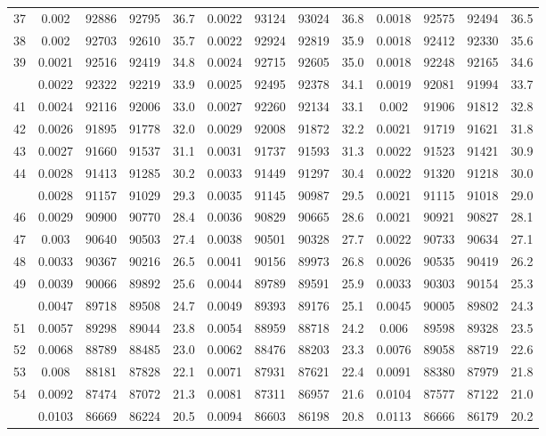 \documentclass[
  14pt,
]{article}
\begin{document}
\begin{longtable}[t]{lcccccccccccc}
37 & 0.002 & 92886 & 92795 & 36.7 & 0.0022 & 93124 & 93024 & 36.8 & 0.0018 & 92575 & 92494 & 36.5\\
38 & 0.002 & 92703 & 92610 & 35.7 & 0.0022 & 92924 & 92819 & 35.9 & 0.0018 & 92412 & 92330 & 35.6\\
39 & 0.0021 & 92516 & 92419 & 34.8 & 0.0024 & 92715 & 92605 & 35.0 & 0.0018 & 92248 & 92165 & 34.6\\
\addlinespace
40 & 0.0022 & 92322 & 92219 & 33.9 & 0.0025 & 92495 & 92378 & 34.1 & 0.0019 & 92081 & 91994 & 33.7\\
41 & 0.0024 & 92116 & 92006 & 33.0 & 0.0027 & 92260 & 92134 & 33.1 & 0.002 & 91906 & 91812 & 32.8\\
42 & 0.0026 & 91895 & 91778 & 32.0 & 0.0029 & 92008 & 91872 & 32.2 & 0.0021 & 91719 & 91621 & 31.8\\
43 & 0.0027 & 91660 & 91537 & 31.1 & 0.0031 & 91737 & 91593 & 31.3 & 0.0022 & 91523 & 91421 & 30.9\\
44 & 0.0028 & 91413 & 91285 & 30.2 & 0.0033 & 91449 & 91297 & 30.4 & 0.0022 & 91320 & 91218 & 30.0\\
\addlinespace
45 & 0.0028 & 91157 & 91029 & 29.3 & 0.0035 & 91145 & 90987 & 29.5 & 0.0021 & 91115 & 91018 & 29.0\\
46 & 0.0029 & 90900 & 90770 & 28.4 & 0.0036 & 90829 & 90665 & 28.6 & 0.0021 & 90921 & 90827 & 28.1\\
47 & 0.003 & 90640 & 90503 & 27.4 & 0.0038 & 90501 & 90328 & 27.7 & 0.0022 & 90733 & 90634 & 27.1\\
48 & 0.0033 & 90367 & 90216 & 26.5 & 0.0041 & 90156 & 89973 & 26.8 & 0.0026 & 90535 & 90419 & 26.2\\
49 & 0.0039 & 90066 & 89892 & 25.6 & 0.0044 & 89789 & 89591 & 25.9 & 0.0033 & 90303 & 90154 & 25.3\\
\addlinespace
50 & 0.0047 & 89718 & 89508 & 24.7 & 0.0049 & 89393 & 89176 & 25.1 & 0.0045 & 90005 & 89802 & 24.3\\
51 & 0.0057 & 89298 & 89044 & 23.8 & 0.0054 & 88959 & 88718 & 24.2 & 0.006 & 89598 & 89328 & 23.5\\
52 & 0.0068 & 88789 & 88485 & 23.0 & 0.0062 & 88476 & 88203 & 23.3 & 0.0076 & 89058 & 88719 & 22.6\\
53 & 0.008 & 88181 & 87828 & 22.1 & 0.0071 & 87931 & 87621 & 22.4 & 0.0091 & 88380 & 87979 & 21.8\\
54 & 0.0092 & 87474 & 87072 & 21.3 & 0.0081 & 87311 & 86957 & 21.6 & 0.0104 & 87577 & 87122 & 21.0\\
\addlinespace
55 & 0.0103 & 86669 & 86224 & 20.5 & 0.0094 & 86603 & 86198 & 20.8 & 0.0113 & 86666 & 86179 & 20.2\\

\end{longtable}
\end{document}
